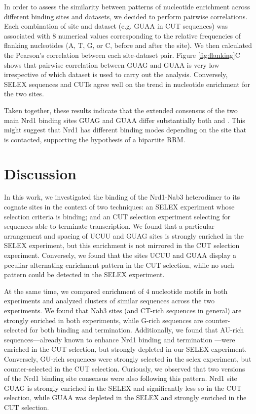 In order to assess the similarity between patterns of nucleotide enrichment across different binding sites and datasets, we decided to perform pairwise correlations. Each combination of site and dataset (e.g. GUAA in CUT sequences) was associated with 8 numerical values corresponding to the relative frequencies of flanking nucleotides (A, T, G, or C, before and after the site).  We then calculated the Pearson’s correlation between each site-dataset pair. Figure \ref{fig:flanking}C shows that pairwise correlation between GUAG and GUAA is very low irrespective of which dataset is used to carry out the analysis. Conversely, SELEX sequences and CUTs agree well on the trend in nucleotide enrichment for the two sites.

Taken together, these results indicate that the extended consensus of the two main Nrd1 binding sites GUAG and GUAA differ substantially both \invitro{} and \invivo{}. This might suggest that Nrd1 has different binding modes depending on the site that is contacted, supporting the hypothesis of a bipartite RRM.

\clearpage

\section{Discussion}

In this work, we investigated the binding of the Nrd1-Nab3 heterodimer to its cognate sites in the context of two techniques: an \invitro{} SELEX experiment whose selection criteria is binding; and an \invivo{} CUT selection experiment selecting for sequences able to terminate transcription. We found that a particular arrangement and spacing of UCUU and GUAG sites is strongly enriched in the SELEX experiment, but this enrichment is not mirrored in the CUT selection experiment. Conversely, we found that the sites UCUU and GUAA display a peculiar alternating enrichment pattern in the \invivo{} CUT selection, while no such pattern could be detected in the SELEX experiment.

At the same time, we compared enrichment of 4 nucleotide motifs in both experiments and analyzed clusters of similar sequences across the two experiments. We found that Nab3 sites (and CT-rich sequences in general) are strongly enriched in both experiments, while G-rich sequences are counter-selected for both \invitro{} binding and \invivo{} termination. Additionally, we found that AU-rich sequences---already known to enhance Nrd1 binding and termination \invivo{} \cite{porrua:2012:in}---were enriched in the CUT selection, but strongly depleted in our SELEX experiment. Conversely, GU-rich sequences were strongly selected in the selex experiment, but counter-selected in the \invivo{} CUT selection. Curiously, we observed that two versions of the Nrd1 binding site consensus were also following this pattern. Nrd1 site GUAG is strongly enriched in the SELEX and significantly less so in the CUT selection, while GUAA was depleted in the SELEX and strongly enriched in the CUT selection. 

